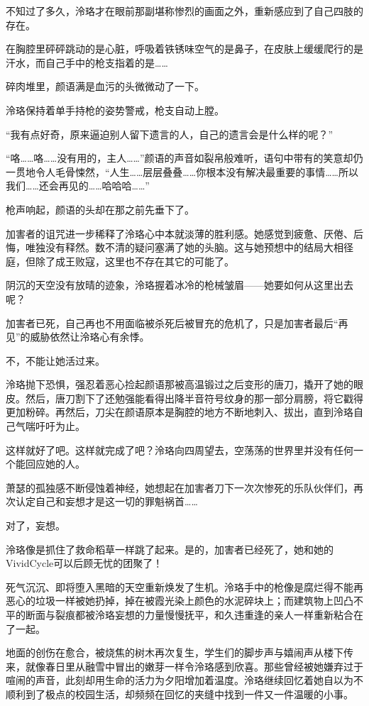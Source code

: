 \documentclass[UTF8, scheme = chinese, openany]{ctexbook}
\begin{document}
不知过了多久，泠珞才在眼前那副堪称惨烈的画面之外，重新感应到了自己四肢的存在。

在胸腔里砰砰跳动的是心脏，呼吸着铁锈味空气的是鼻子，在皮肤上缓缓爬行的是汗水，而自己手中的枪支指着的是……

碎肉堆里，颜语满是血污的头微微动了一下。

泠珞保持着单手持枪的姿势警戒，枪支自动上膛。

“我有点好奇，原来逼迫别人留下遗言的人，自己的遗言会是什么样的呢？”

“咯……咯……没有用的，主人……”颜语的声音如裂帛般难听，语句中带有的笑意却仍一贯地令人毛骨悚然，“人生……层层叠叠……你根本没有解决最重要的事情……所以我们……还会再见的……哈哈哈……”

枪声响起，颜语的头却在那之前先垂下了。

加害者的诅咒进一步稀释了泠珞心中本就淡薄的胜利感。她感觉到疲惫、厌倦、后悔，唯独没有释然。数不清的疑问塞满了她的头脑。这与她预想中的结局大相径庭，但除了成王败寇，这里也不存在其它的可能了。

阴沉的天空没有放晴的迹象，泠珞握着冰冷的枪械皱眉——她要如何从这里出去呢？

加害者已死，自己再也不用面临被杀死后被冒充的危机了，只是加害者最后“再见”的威胁依然让泠珞心有余悸。

不，不能让她活过来。

泠珞抛下恐惧，强忍着恶心捡起颜语那被高温锻过之后变形的唐刀，撬开了她的眼皮。然后，唐刀割下了还勉强能看得出降半音符号纹身的那一部分肩膀，将它戳得更加粉碎。再然后，刀尖在颜语原本是胸腔的地方不断地刺入、拔出，直到泠珞自己气喘吁吁为止。

这样就好了吧。这样就完成了吧？泠珞向四周望去，空荡荡的世界里并没有任何一个能回应她的人。

萧瑟的孤独感不断侵蚀着神经，她想起在加害者刀下一次次惨死的乐队伙伴们，再次认定自己和妄想才是这一切的罪魁祸首……

对了，妄想。

泠珞像是抓住了救命稻草一样跳了起来。是的，加害者已经死了，她和她的VividCycle可以后顾无忧的团聚了！

死气沉沉、即将堕入黑暗的天空重新焕发了生机。泠珞手中的枪像是腐烂得不能再恶心的垃圾一样被她扔掉，掉在被霞光染上颜色的水泥碎块上；而建筑物上凹凸不平的断面与裂痕都被泠珞妄想的力量慢慢抚平，和久违重逢的亲人一样重新粘合在了一起。

地面的创伤在愈合，被烧焦的树木再次复生，学生们的脚步声与嬉闹声从楼下传来，就像春日里从融雪中冒出的嫩芽一样令泠珞感到欣喜。那些曾经被她嫌弃过于喧闹的声音，此刻却用生命的活力为夕阳增加着温度。泠珞继续回忆着她自以为不顺利到了极点的校园生活，却频频在回忆的夹缝中找到一件又一件温暖的小事。
\end{document}
